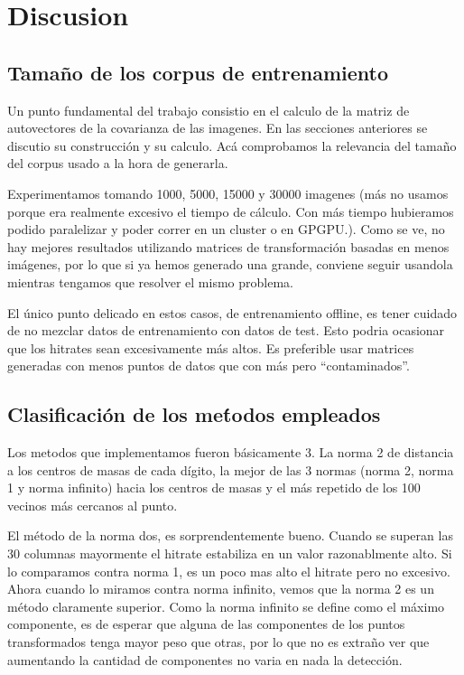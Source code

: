 \section{Discusion}

\subsection{Tama\~no de los corpus de entrenamiento }
Un punto fundamental del trabajo consistio en el calculo de la matriz de autovectores
de la covarianza de las imagenes. En las secciones anteriores se discutio su construcci\'on
y su calculo. Ac\'a comprobamos la relevancia del tama\~no del corpus usado a la hora
de generarla.

Experimentamos tomando 1000, 5000, 15000 y 30000 imagenes (m\'as no usamos porque era
realmente excesivo el tiempo de c\'alculo. Con m\'as tiempo hubieramos podido paralelizar
y poder correr en un cluster o en GPGPU.). Como se ve, no hay mejores resultados
utilizando matrices de transformaci\'on basadas en menos im\'agenes, por lo que
si ya hemos generado una grande, conviene seguir usandola mientras tengamos que resolver
el mismo problema.

El \'unico punto delicado en estos casos, de entrenamiento offline, es tener cuidado
de no mezclar datos de entrenamiento con datos de test. Esto podria ocasionar que
los hitrates sean excesivamente m\'as altos. Es preferible usar matrices generadas
con menos puntos de datos que con m\'as pero ``contaminados''.


\subsection{Clasificaci\'on de los me\'todos empleados}
Los metodos que implementamos fueron b\'asicamente 3. La norma 2 de distancia a
los centros de masas de cada d\'igito, la mejor de las 3 normas (norma 2, norma 1 y norma infinito)
hacia los centros de masas y el m\'as repetido de los 100 vecinos m\'as cercanos al punto.

El m\'etodo de la norma dos, es sorprendentemente bueno. Cuando se superan las 30
columnas mayormente el hitrate estabiliza en un valor razonablmente alto. Si lo
comparamos contra norma 1, es un poco mas alto el hitrate pero no excesivo. Ahora
cuando lo miramos contra norma infinito, vemos que la norma 2 es un m\'etodo
claramente superior. Como la norma infinito se define como el m\'aximo componente,
es de esperar que alguna de las componentes de los puntos transformados tenga mayor
peso que otras, por lo que no es extra\~no ver que aumentando la cantidad de componentes
no varia en nada la detecci\'on.

